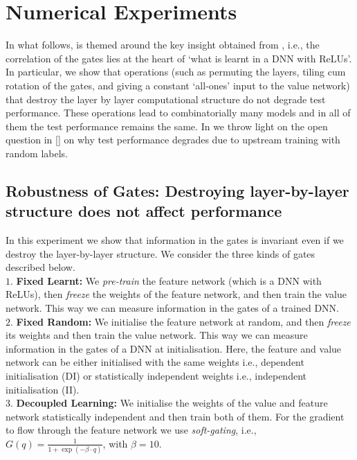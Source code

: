 \section{Numerical Experiments}\label{sec:exp} 
In what follows,  is themed around the key insight obtained from , i.e., the correlation of the gates lies at the heart of `what is learnt in a DNN with ReLUs'. In particular, we show that operations (such as permuting the layers, tiling cum rotation of the gates, and giving a constant `all-ones' input to the value network) that destroy the layer by layer computational structure do not degrade test performance. These operations lead to combinatorially many models and in all of them the test performance remains the same. In  we throw light on the open question in [] on why test performance degrades due to upstream training with random labels.
\subsection{Robustness of Gates: Destroying layer-by-layer structure does not affect performance}\label{sec:exp1}
In this experiment we show that information in the gates is invariant even if we destroy the layer-by-layer structure. We consider the three kinds of gates described below.\\
\indent \quad$1.$ \textbf{Fixed Learnt:} We \emph{pre-train} the feature network (which is a DNN with ReLUs), then \emph{freeze} the weights of the feature network, and then train the value network. This way we can measure information in the gates of a trained DNN.\\
\indent \quad$2.$ \textbf{Fixed Random:} We initialise the feature network at random, and then \emph{freeze} its weights and then train the value network. This way we can measure information in the gates of a DNN at initialisation. Here, the feature and value network can be either initialised with the same weights i.e., dependent initialisation (DI) or statistically independent weights  i.e., independent initialisation (II).\\
\indent \quad$3.$ \textbf{Decoupled Learning:} We initialise the weights of the value and feature network statistically independent and then train both of them. For the gradient to flow through the feature network we use \emph{soft-gating}, i.e., $G(q)=\frac{1}{1+\exp({-\beta\cdot q})}$, with $\beta=10$. 

